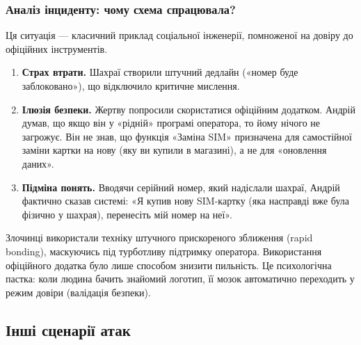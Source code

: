 \subsubsection*{Аналіз інциденту: чому схема спрацювала?}

Ця ситуація — класичний приклад соціальної інженерії, помноженої на довіру до офіційних інструментів.

\begin{enumerate}
    \item \textbf{Страх втрати.} Шахраї створили штучний дедлайн («номер буде заблоковано»), що відключило критичне мислення.
    \item \textbf{Ілюзія безпеки.} Жертву попросили скористатися офіційним додатком. Андрій думав, що якщо він у «рідній» програмі оператора, то йому нічого не загрожує. Він не знав, що функція «Заміна SIM» призначена для самостійної заміни картки на нову (яку ви купили в магазині), а не для «оновлення даних».
    \item \textbf{Підміна понять.} Вводячи серійний номер, який надіслали шахраї, Андрій фактично сказав системі: «Я купив нову SIM-картку (яка насправді вже була фізично у шахрая), перенесіть мій номер на неї».
\end{enumerate}

Злочинці використали техніку штучного прискореного зближення (rapid bonding), маскуючись під турботливу підтримку оператора. Використання офіційного додатка було лише способом знизити пильність. Це психологічна пастка: коли людина бачить знайомий логотип, її мозок автоматично переходить у режим довіри (валідація безпеки).

\subsection*{Інші сценарії атак}

